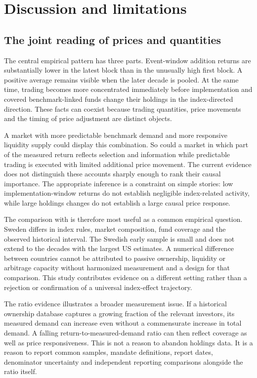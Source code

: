 \section{Discussion and limitations}
\subsection{The joint reading of prices and quantities}

The central empirical pattern has three parts. Event-window addition returns are substantially lower in the latest block than in the unusually high first block. A positive average remains visible when the later decade is pooled. At the same time, trading becomes more concentrated immediately before implementation and covered benchmark-linked funds change their holdings in the index-directed direction. These facts can coexist because trading quantities, price movements and the timing of price adjustment are distinct objects.

A market with more predictable benchmark demand and more responsive liquidity supply could display this combination. So could a market in which part of the measured return reflects selection and information while predictable trading is executed with limited additional price movement. The current evidence does not distinguish these accounts sharply enough to rank their causal importance. The appropriate inference is a constraint on simple stories: low implementation-window returns do not establish negligible index-related activity, while large holdings changes do not establish a large causal price response.

The comparison with \citet{greenwood2025} is therefore most useful as a common empirical question. Sweden differs in index rules, market composition, fund coverage and the observed historical interval. The Swedish early sample is small and does not extend to the decades with the largest US estimates. A numerical difference between countries cannot be attributed to passive ownership, liquidity or arbitrage capacity without harmonized measurement and a design for that comparison. This study contributes evidence on a different setting rather than a rejection or confirmation of a universal index-effect trajectory.

The ratio evidence illustrates a broader measurement issue. If a historical ownership database captures a growing fraction of the relevant investors, its measured demand can increase even without a commensurate increase in total demand. A falling return-to-measured-demand ratio can then reflect coverage as well as price responsiveness. This is not a reason to abandon holdings data. It is a reason to report common samples, mandate definitions, report dates, denominator uncertainty and independent reporting comparisons alongside the ratio itself.

